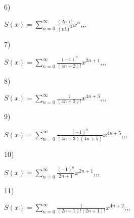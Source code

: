 \documentclass[11pt, ukrainian]{article}
\begin{document}
6) \space 
{%
{$S(x)=\sum\limits_{n=0}^{\infty}{\frac{(2n)!}{(n!)^2}}{x^{n}}$},,, \par \smallskip  
}
\par
\vspace{0.9cm}
7) \space 
{%
{$S(x)=\sum\limits_{n=0}^{\infty}{\frac{(-1)^n}{(4n+2)!}}{x^{{2n+1}}}$},,, \par \smallskip  
}
\par
\vspace{0.9cm}
8) \space 
{%
{$S(x)=\sum\limits_{n=0}^{\infty}{\frac{1}{(4n+3)!}}{x^{{4n+3}}}$},,, \par \smallskip  
}
\par
\newpage
9) \space 
{%
{$S(x)=\sum\limits_{n=0}^{\infty}{\frac{(-1)^n}{(4n+3)(4n+5)}}{x^{{4n+5}}}$},,, \par \smallskip  
}
\par
\vspace{0.9cm}
10) \space 
{%
{$S(x)=\sum\limits_{n=0}^{\infty}{\frac{(-1)^{n}}{2n+1}}{x^{{2n+1}}}$},,, \par \smallskip  
}
\par
\vspace{0.9cm}
11) \space 
{%
{$S(x)=\sum\limits_{n=0}^{\infty}{\frac{1}{(2n+1)!(2n+1)!}}{x^{{4n+2}}}$},,, \par \smallskip  
}
\end{document}
